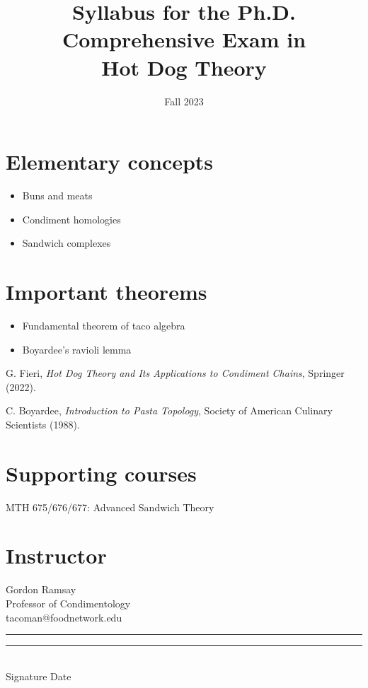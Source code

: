 \documentclass[12pt]{article}
\newcommand\TITLE{
	Syllabus for the Ph.D. Comprehensive Exam in\\Hot Dog Theory
}
\newcommand\DATE{Fall 2023}
\begin{document}
\title{\TITLE}
\date{\DATE}
\maketitle


\section*{Elementary concepts}
\begin{itemize}[itemsep=0pt]
	\item Buns and meats
	\item Condiment homologies
	\item Sandwich complexes
\end{itemize}


\section*{Important theorems}
\begin{itemize}[itemsep=0pt]
	\item Fundamental theorem of taco algebra
	\item Boyardee's ravioli lemma
\end{itemize}


\begin{thebibliography}{9}

		G. Fieri,
		\emph{Hot Dog Theory and Its Applications to Condiment Chains},
		Springer (2022).

		C. Boyardee,
		\emph{Introduction to Pasta Topology},
		Society of American Culinary Scientists (1988).

\end{thebibliography}


\section*{Supporting courses}
MTH 675/676/677: Advanced Sandwich Theory


\section*{Instructor}


\noindent
Gordon Ramsay
\\
Professor of Condimentology
\\
tacoman@foodnetwork.edu
\\[2cm]
\noindent
\rule{0.5\textwidth}{0.4pt}
\hspace{5mm}
\rule{0.2\textwidth}{0.4pt}
\\
Signature
\hspace{66mm}
Date


\end{document}
